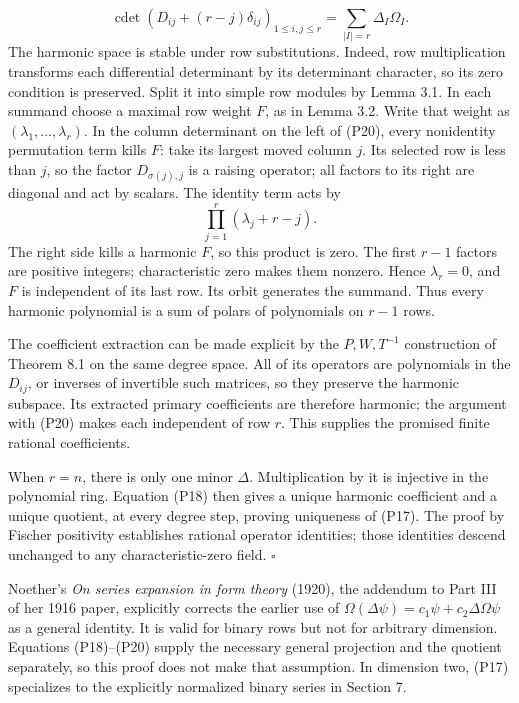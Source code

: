 \documentclass[
]{article}
\begin{document}
\[
\operatorname{cdet}(D_{ij}+(r-j)\delta_{ij})_{1\leq i,j\leq r}
=\sum_{|I|=r}\Delta_I\Omega_I.
\tag{P20}
\] The harmonic space is stable under row substitutions. Indeed, row
multiplication transforms each differential determinant by its
determinant character, so its zero condition is preserved. Split it into
simple row modules by Lemma 3.1. In each summand choose a maximal row
weight \(F\), as in Lemma 3.2. Write that weight as
\((\lambda_1,\ldots,\lambda_r)\). In the column determinant on the left
of (P20), every nonidentity permutation term kills \(F\): take its
largest moved column \(j\). Its selected row is less than \(j\), so the
factor \(D_{\sigma(j),j}\) is a raising operator; all factors to its
right are diagonal and act by scalars. The identity term acts by \[
\prod_{j=1}^r(\lambda_j+r-j).
\] The right side kills a harmonic \(F\), so this product is zero. The
first \(r-1\) factors are positive integers; characteristic zero makes
them nonzero. Hence \(\lambda_r=0\), and \(F\) is independent of its
last row. Its orbit generates the summand. Thus every harmonic
polynomial is a sum of polars of polynomials on \(r-1\) rows.

The coefficient extraction can be made explicit by the \(P,W,T^{-1}\)
construction of Theorem 8.1 on the same degree space. All of its
operators are polynomials in the \(D_{ij}\), or inverses of invertible
such matrices, so they preserve the harmonic subspace. Its extracted
primary coefficients are therefore harmonic; the argument with (P20)
makes each independent of row \(r\). This supplies the promised finite
rational coefficients.

When \(r=n\), there is only one minor \(\Delta\). Multiplication by it
is injective in the polynomial ring. Equation (P18) then gives a unique
harmonic coefficient and a unique quotient, at every degree step,
proving uniqueness of (P17). The proof by Fischer positivity establishes
rational operator identities; those identities descend unchanged to any
characteristic-zero field. \(\square\)

Noether's \emph{On series expansion in form theory} (1920), the addendum
to Part III of her 1916 paper, explicitly corrects the earlier use of
\(\Omega(\Delta\psi)=c_1\psi+c_2\Delta\Omega\psi\) as a general
identity. It is valid for binary rows but not for arbitrary dimension.
Equations (P18)--(P20) supply the necessary general projection and the
quotient separately, so this proof does not make that assumption. In
dimension two, (P17) specializes to the explicitly normalized binary
series in Section 7.
\end{document}
